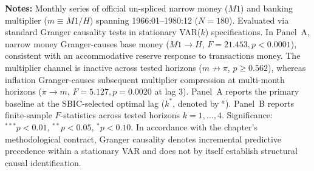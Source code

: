 \begin{table}[htbp]
{%
}
\begin{minipage}{0.96\textwidth}
\vspace{0.3em}
\footnotesize \textbf{Notes:} Monthly series of official un-spliced narrow money ($M1$) and banking multiplier ($m \equiv M1/H$) spanning 1966:01--1980:12 ($N=180$). Evaluated via standard Granger causality tests in stationary VAR($k$) specifications. In Panel~A, narrow money Granger-causes base money ($M1 \to H$, $F = 21.453, p < 0.0001$), consistent with an accommodative reserve response to transactions money. The multiplier channel is inactive across tested horizons ($m \not\to \pi$, $p \ge 0.562$), whereas inflation Granger-causes subsequent multiplier compression at multi-month horizons ($\pi \to m$, $F = 5.127, p = 0.0020$ at lag 3). Panel~A reports the primary baseline at the SBIC-selected optimal lag ($k^*$, denoted by $^a$). Panel~B reports finite-sample $F$-statistics across tested horizons $k = 1, \dots, 4$. Significance: $^{***} p < 0.01$, $^{**} p < 0.05$, $^{*} p < 0.10$. In accordance with the chapter's methodological contract, Granger causality denotes incremental predictive precedence within a stationary VAR and does not by itself establish structural causal identification.
\end{minipage}
\end{table}
